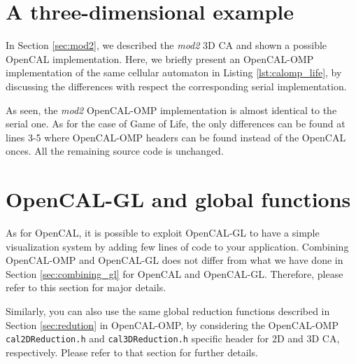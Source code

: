 \section{A three-dimensional example}
In Section \ref{sec:mod2}, we described the \emph{mod2} 3D CA and
shown a possible OpenCAL implementation. Here, we briefly present an
OpenCAL-OMP implementation of the same cellular automaton in Listing
\ref{lst:calomp_life}, by discussing the differences with respect the
corresponding serial implementation.



As seen, the \emph{mod2} OpenCAL-OMP implementation is almost
identical to the serial one. As for the case of Game of Life, the only
differences can be found at lines 3-5 where OpenCAL-OMP headers can be
found instead of the OpenCAL onces. All the remaining source code is
unchanged.

\section{OpenCAL-GL and global functions}

As for OpenCAL, it is possible to exploit OpenCAL-GL to have a simple
visualization system by adding few lines of code to your
application. Combining OpenCAL-OMP and OpenCAL-GL does not differ from
what we have done in Section \ref{sec:combining_gl} for OpenCAL and
OpenCAL-GL. Therefore, please refer to this section for major details.

Similarly, you can also use the same global reduction functions
described in Section \ref{sec:redution} in OpenCAL-OMP, by considering
the OpenCAL-OMP \verb'cal2DReduction.h' and \verb'cal3DReduction.h'
specific header for 2D and 3D CA, respectively. Please refer to that
section for further details.
